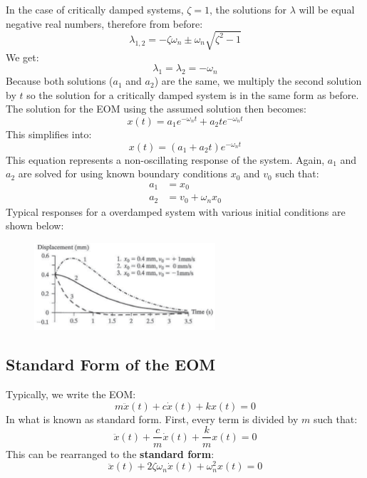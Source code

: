 \documentclass[12pt,a4paper]{article}
\begin{document}
			In the case of critically damped systems, $\zeta=1$, the solutions for $\lambda$ will be equal negative real numbers, therefore from before:
			\begin{equation}
				\lambda_{1,2} = -\zeta\omega_n \pm \omega_n \sqrt{\zeta^2-1}
			\end{equation}
			We get:
			\begin{equation}
				\lambda_{1} = \lambda_{2} = -\omega_n
			\end{equation} 			
			Because both solutions ($a_1$ and $a_2$) are the same, we multiply the second solution by $t$ so the solution for a critically damped system is in the same form as before. The solution for the EOM using the assumed solution then becomes:
			\begin{equation}
				x(t) = a_1e^{-\omega_nt} + a_2te^{-\omega_nt} 
			\end{equation} 
			This simplifies into:			
			\begin{equation}
				x(t) = (a_1+a_2t) e^{-\omega_nt} 
			\end{equation}
			This equation represents a non-oscillating response of the system. Again, $a_1$ and $a_2$ are solved for using known boundary conditions $x_0$ and $v_0$ such that:
			\begin{align}
				a_1 &= x_0 \\ 
				a_2 &= v_0+\omega_nx_0
			\end{align}				
			Typical responses for a overdamped system with various initial conditions are shown below:
			\begin{figure}[H]
				\centering
				\includegraphics[width=0.6\textwidth]{../../Figures/Critically_damped_system.png}
			\end{figure}

		\subsection*{Standard Form of the EOM}
			Typically, we write the EOM:
			\begin{equation}
				m\ddot{x}(t) + c \dot{x}(t) + kx(t) = 0
			\end{equation}
			In what is known as standard form. First, every term is divided by $m$ such that:
			\begin{equation}
				\ddot{x}(t) + \frac{c}{m}\dot{x}(t) + \frac{k}{m}x(t) = 0
			\end{equation}		
			This can be rearranged to the \textbf{standard form}:
			\begin{equation}
				\ddot{x}(t) + 2\zeta\omega_n\dot{x}(t) + \omega_n^2x(t) = 0
			\end{equation}	
\end{document}
